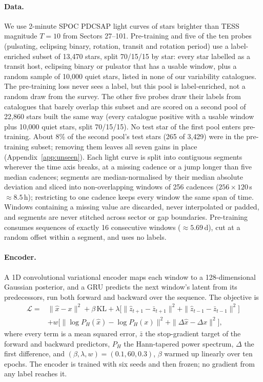 \documentclass{article}
\begin{document}
\paragraph{Data.} We use 2-minute SPOC PDCSAP light curves of stars brighter than TESS magnitude
$T = 10$ from Sectors 27--101. Pre-training and five of the ten probes (pulsating, eclipsing binary,
rotation, transit and rotation period) use a label-enriched subset of 13{,}470 stars, split 70/15/15
by star: every star labelled as a transit host, eclipsing binary or pulsator that has a usable
window, plus a random sample of 10{,}000 quiet stars, listed in none of our variability catalogues. The pre-training
loss never sees a label, but this pool is label-enriched, not a random draw from the survey. The other five probes draw their labels from catalogues that barely overlap this subset and are scored on a second pool of 22{,}860 stars built the same way (every catalogue positive
with a usable window plus 10{,}000 quiet stars, split 70/15/15). No test star of the first pool
enters pre-training. About 8\% of the second pool's test stars (265 of 3{,}429) were in the pre-training subset; removing them leaves all seven gains in place
(Appendix~\ref{app:unseen}). Each light curve is split into contiguous segments wherever the time axis
breaks, at a missing cadence or a jump longer than five median cadences; segments are
median-normalised by their median absolute deviation and sliced into non-overlapping windows of 256
cadences ($256 \times 120$\,s $\approx 8.5$\,h); restricting to one cadence keeps every window the
same span of time. Windows containing a missing value are discarded, never interpolated or padded,
and segments are never stitched across sector or gap boundaries. Pre-training consumes
sequences of exactly 16 consecutive windows ($\approx 5.69$\,d), cut at a random offset within a
segment, and uses no labels.

\paragraph{Encoder.} A 1D convolutional variational encoder \citep{kingma2014} maps each window to a
128-dimensional Gaussian posterior, and a GRU \citep{cho2014} predicts the next window's latent from
its predecessors, run both forward and backward over the sequence. The objective is
\begin{align*}
\mathcal{L} = {} & \|\hat{x}-x\|^{2} + \beta\,\mathrm{KL}
+ \lambda\big[\|\hat{z}_{t+1}-\bar{z}_{t+1}\|^{2} + \|\hat{z}_{t-1}-\bar{z}_{t-1}\|^{2}\big] \\
& + w\big[\|\log P_{H}(\hat{x})-\log P_{H}(x)\|^{2} + \|\Delta\hat{x}-\Delta x\|^{2}\big],
\end{align*}
where every term is a mean squared error, $\bar{z}$ the stop-gradient target of the forward and
backward predictors, $P_{H}$ the Hann-tapered power spectrum, $\Delta$ the first difference, and
$(\beta,\lambda,w) = (0.1, 60, 0.3)$, $\beta$ warmed up linearly over ten epochs. The encoder is trained with six seeds and then frozen; no gradient from any label reaches
it.
\end{document}

